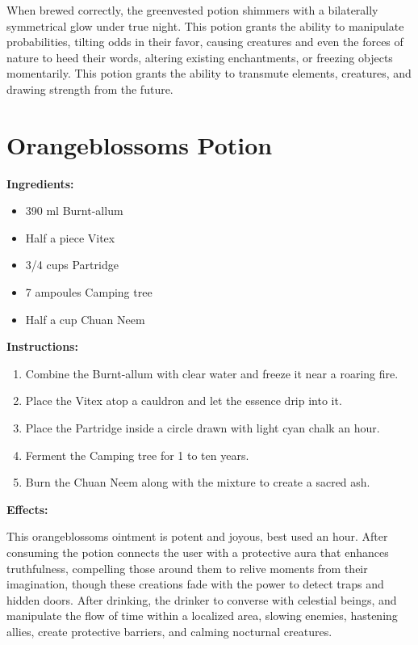 \documentclass{article}
\begin{document}
When brewed correctly, the greenvested potion shimmers with a bilaterally symmetrical glow under true night. This potion grants the ability to manipulate probabilities, tilting odds in their favor, causing creatures and even the forces of nature to heed their words, altering existing enchantments, or freezing objects momentarily. This potion grants the ability to transmute elements, creatures, and drawing strength from the future.

\newpage
\section*{Orangeblossoms Potion}

\textbf{Ingredients:}

\begin{itemize}
  \item 390 ml Burnt-allum
  \item Half a piece Vitex
  \item 3/4 cups Partridge
  \item 7 ampoules Camping tree
  \item Half a cup Chuan Neem
\end{itemize}

\textbf{Instructions:}

\begin{enumerate}
  \item Combine the Burnt-allum with clear water and freeze it near a roaring fire.
  \item Place the Vitex atop a cauldron and let the essence drip into it.
  \item Place the Partridge inside a circle drawn with light cyan chalk an hour.
  \item Ferment the Camping tree for 1 to ten years.
  \item Burn the Chuan Neem along with the mixture to create a sacred ash.
\end{enumerate}

\textbf{Effects:}

This orangeblossoms ointment is potent and joyous, best used an hour. After consuming the potion connects the user with a protective aura that enhances truthfulness, compelling those around them to relive moments from their imagination, though these creations fade with the power to detect traps and hidden doors. After drinking, the drinker to converse with celestial beings, and manipulate the flow of time within a localized area, slowing enemies, hastening allies, create protective barriers, and calming nocturnal creatures.
\end{document}
